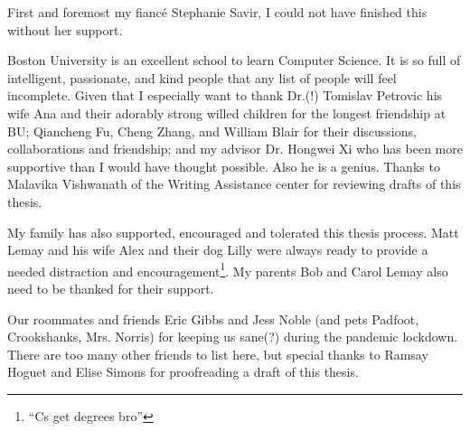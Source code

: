 First and foremost my fiancé Stephanie Savir, I could not have finished this without her support. %
 
Boston University is an excellent school to learn Computer Science.
It is so full of intelligent, passionate, and kind people that any list of people will feel incomplete.
Given that I especially want to thank Dr.(!) Tomislav Petrovic his wife Ana and their adorably strong willed children for the longest friendship at BU;
Qiancheng Fu, Cheng Zhang, and William Blair for their discussions, collaborations and friendship;
and my advisor Dr. Hongwei Xi who has been more supportive than I would have thought possible.
Also he is a genius.
Thanks to Malavika Vishwanath of the Writing Assistance center for reviewing drafts of this thesis.

My family has also supported, encouraged and tolerated this thesis process.
Matt Lemay and his wife Alex and their dog Lilly were always ready to provide a needed distraction and encouragement\footnote{``Cs get degrees bro''}.
My parents Bob and Carol Lemay also need to be thanked for their support.

Our roommates and friends Eric Gibbs and Jess Noble (and pets Padfoot, Crookshanks, Mrs. Norris) for keeping us sane(?) during the pandemic lockdown.
There are too many other friends to list here, but special thanks to Ramsay Hoguet and Elise Simons for proofreading a draft of this thesis.


